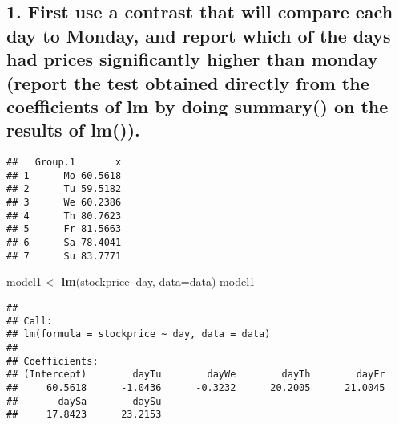 \documentclass[]{article}
\newenvironment{Shaded}{\begin{snugshade}}{\end{snugshade}}
\newcommand{\KeywordTok}[1]{\textcolor[rgb]{0.13,0.29,0.53}{\textbf{#1}}}
\newcommand{\DataTypeTok}[1]{\textcolor[rgb]{0.13,0.29,0.53}{#1}}
\newcommand{\DecValTok}[1]{\textcolor[rgb]{0.00,0.00,0.81}{#1}}
\newcommand{\StringTok}[1]{\textcolor[rgb]{0.31,0.60,0.02}{#1}}
\newcommand{\CommentTok}[1]{\textcolor[rgb]{0.56,0.35,0.01}{\textit{#1}}}
\newcommand{\OperatorTok}[1]{\textcolor[rgb]{0.81,0.36,0.00}{\textbf{#1}}}
\newcommand{\NormalTok}[1]{#1}
\begin{document}
\subsection{1. First use a contrast that will compare each day to
Monday, and report which of the days had prices significantly higher
than monday (report the test obtained directly from the coefficients of
lm by doing summary() on the results of
lm()).}\label{first-use-a-contrast-that-will-compare-each-day-to-monday-and-report-which-of-the-days-had-prices-significantly-higher-than-monday-report-the-test-obtained-directly-from-the-coefficients-of-lm-by-doing-summary-on-the-results-of-lm.}

\begin{Shaded}
\end{Shaded}

\begin{verbatim}
##   Group.1       x
## 1      Mo 60.5618
## 2      Tu 59.5182
## 3      We 60.2386
## 4      Th 80.7623
## 5      Fr 81.5663
## 6      Sa 78.4041
## 7      Su 83.7771
\end{verbatim}

\begin{Shaded}
\begin{Highlighting}[]
\NormalTok{model1 <-}\StringTok{ }\KeywordTok{lm}\NormalTok{(stockprice}\OperatorTok{~}\NormalTok{day, }\DataTypeTok{data=}\NormalTok{data)}
\NormalTok{model1}
\end{Highlighting}
\end{Shaded}

\begin{verbatim}
## 
## Call:
## lm(formula = stockprice ~ day, data = data)
## 
## Coefficients:
## (Intercept)        dayTu        dayWe        dayTh        dayFr  
##     60.5618      -1.0436      -0.3232      20.2005      21.0045  
##       daySa        daySu  
##     17.8423      23.2153
\end{verbatim}
\end{document}

